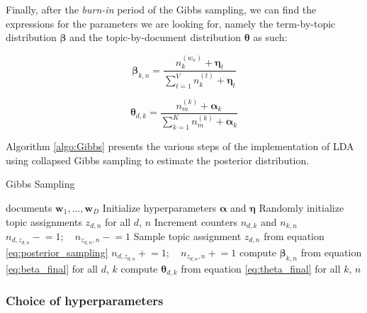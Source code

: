 \documentclass{article}
\begin{document}
Finally, after the \textit{burn-in} period of the Gibbs sampling, we can find the expressions for the parameters we are looking for, namely the term-by-topic distribution $\bm{\beta}$ and the topic-by-document distribution $\bm{\theta}$ as such:


\begin{equation}\label{eq:beta_final}
\bm{\beta}_{k,n} = \frac{n_k ^{(w_n)} + \bm{\eta}_{t}}{\sum_{t=1}^{V} n_k ^{(t)} + \bm{\eta}_{t}}
\end{equation}

\begin{equation}\label{eq:theta_final}
\bm{\theta}_{d,k} = \frac{n_m ^{(k)} + \bm{\alpha}_k}{\sum_{k=1}^{K} n_m ^{(k)} + \bm{\alpha}_k}
\end{equation}

Algorithm \ref{algo:Gibbs} presents the various steps of the implementation of LDA using collapsed Gibbs sampling to estimate the posterior distribution.


\begin{algorithm}[htb]
   \caption{Gibbs Sampling}
   \label{algo:Gibbs}
\begin{algorithmic}
    documents $\mathbf{w}_1,...,\mathbf{w}_D$   
   \STATE Initialize hyperparameters $\bm{\alpha}$ and $\bm{\eta}$
   \STATE Randomly initialize topic assignments $z_{d,n}$ for all $d$, $n$
   \STATE Increment counters $n_{d,k}$ and $n_{k,n}$
   \REPEAT
  	  \STATE $n_{d,z_{d,n}} -\!\!= 1;\quad n_{z_{d,n},n} -\!\!= 1$
	  \STATE Sample topic assignment $z_{d,n}$ from equation \ref{eq:posterior_sampling}
	  \STATE $n_{d,z_{d,n}} +\!\!= 1;\quad n_{z_{d,n},n} +\!\!= 1$
  	  \ENDFOR
   \ENDFOR
   \STATE compute $\bm{\beta}_{k,n}$ from equation \ref{eq:beta_final} for all $d$, $k$
   \STATE compute $\bm{\theta}_{d,k}$ from equation \ref{eq:theta_final} for all $k$, $n$

\end{algorithmic}
\end{algorithm}



\subsubsection{Choice of hyperparameters}
\end{document}
